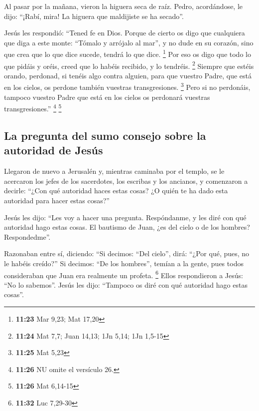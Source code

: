 \begin{paracol}{2}
 Al pasar por la mañana, vieron la higuera seca de raíz.
 Pedro, acordándose, le dijo: ``¡Rabí, mira! La higuera
que maldijiste se ha secado''.

 Jesús les respondió: ``Tened fe en Dios. 
Porque de cierto os digo que cualquiera que diga a este monte: ``Tómalo
y arrójalo al mar'', y no dude en su corazón, sino que crea que lo que
dice sucede, tendrá lo que dice. \footnote{\textbf{11:23} Mar 9,23; Mat
  17,20}  Por eso os digo que todo lo que pidáis y oréis,
creed que lo habéis recibido, y lo tendréis. \footnote{\textbf{11:24}
  Mat 7,7; Juan 14,13; 1Jn 5,14; 1Jn 1,5-15}  Siempre que
estéis orando, perdonad, si tenéis algo contra alguien, para que vuestro
Padre, que está en los cielos, os perdone también vuestras
transgresiones. \footnote{\textbf{11:25} Mat 5,23}  Pero
si no perdonáis, tampoco vuestro Padre que está en los cielos os
perdonará vuestras transgresiones.'' \footnote{\textbf{11:26} NU omite
  el versículo 26.} \footnote{\textbf{11:26} Mat 6,14-15}

\hypertarget{la-pregunta-del-sumo-consejo-sobre-la-autoridad-de-jesuxfas}{%
\subsection{La pregunta del sumo consejo sobre la autoridad de
Jesús}\label{la-pregunta-del-sumo-consejo-sobre-la-autoridad-de-jesuxfas}}

 Llegaron de nuevo a Jerusalén y, mientras caminaba por
el templo, se le acercaron los jefes de los sacerdotes, los escribas y
los ancianos,  y comenzaron a decirle: ``¿Con qué
autoridad haces estas cosas? ¿O quién te ha dado esta autoridad para
hacer estas cosas?''

 Jesús les dijo: ``Les voy a hacer una pregunta.
Respóndanme, y les diré con qué autoridad hago estas cosas.
 El bautismo de Juan, ¿es del cielo o de los hombres?
Respondedme''.

 Razonaban entre sí, diciendo: ``Si decimos: ``Del
cielo'', dirá: ``¿Por qué, pues, no le habéis creído?'' 
Si decimos: ``De los hombres'', temían a la gente, pues todos
consideraban que Juan era realmente un profeta. \footnote{\textbf{11:32}
  Luc 7,29-30}  Ellos respondieron a Jesús: ``No lo
sabemos''. Jesús les dijo: ``Tampoco os diré con qué autoridad hago
estas cosas''.


\end{paracol}
